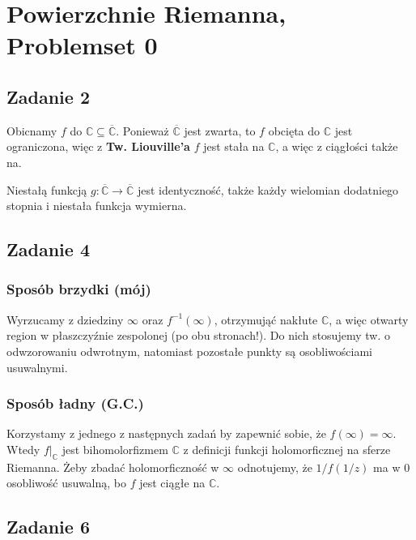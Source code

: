 \chapter{Powierzchnie Riemanna, Problemset 0}


\section*{Zadanie 2}

Obicnamy \( f \) do \( \mathbb{C} \subseteq \overline{ \mathbb{C} } \). Ponieważ \( \overline{ \mathbb{C} } \) jest zwarta, to \( f \) obcięta do \( \mathbb{C} \) jest ograniczona, więc z \textbf{Tw. Liouville'a} \( f \) jest stała na \( \mathbb{C} \), a więc z ciągłości także na.

Niestałą funkcją \( g: \overline{ \mathbb{C} } \to \overline{ \mathbb{C} } \) jest identyczność, także każdy wielomian dodatniego stopnia i niestała funkcja wymierna.

\section*{Zadanie 4}

\subsection*{Sposób brzydki (mój)}

Wyrzucamy z dziedziny \( \infty \) oraz \( f^{-1}(\infty) \), otrzymująć nakłute \( \mathbb{C} \), a więc otwarty region w płaszczyźnie zespolonej (po obu stronach!). Do nich stosujemy tw. o odwzorowaniu odwrotnym, natomiast pozostałe punkty są osobliwościami usuwalnymi.

\subsection*{Sposób ładny (G.C.)}

Korzystamy z jednego z następnych zadań by zapewnić sobie, że \( f(\infty) = \infty \). Wtedy \( f|_\mathbb{C} \) jest bihomolorfizmem \( \mathbb{C} \) z definicji funkcji holomorficznej na sferze Riemanna. Żeby zbadać holomorficzność w \( \infty \) odnotujemy, że \( 1/f(1/z) \) ma w \( 0 \) osobliwość usuwalną, bo \( f \) jest ciągłe na \( \mathbb{C} \).

\section*{Zadanie 6}

